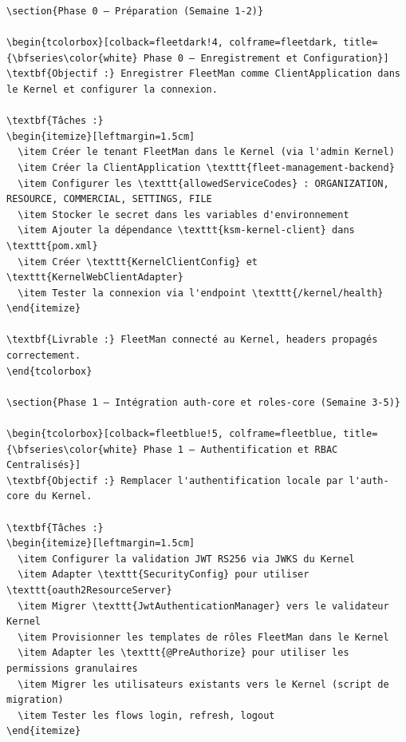 \documentclass[12pt,a4paper]{report}
\begin{document}
\begin{lstlisting}[style=javaStyle, caption={Handler d'erreurs Kernel dans GlobalExceptionHandler}]
\section{Phase 0 — Préparation (Semaine 1-2)}

\begin{tcolorbox}[colback=fleetdark!4, colframe=fleetdark, title={\bfseries\color{white} Phase 0 — Enregistrement et Configuration}]
\textbf{Objectif :} Enregistrer FleetMan comme ClientApplication dans le Kernel et configurer la connexion.

\textbf{Tâches :}
\begin{itemize}[leftmargin=1.5cm]
  \item Créer le tenant FleetMan dans le Kernel (via l'admin Kernel)
  \item Créer la ClientApplication \texttt{fleet-management-backend}
  \item Configurer les \texttt{allowedServiceCodes} : ORGANIZATION, RESOURCE, COMMERCIAL, SETTINGS, FILE
  \item Stocker le secret dans les variables d'environnement
  \item Ajouter la dépendance \texttt{ksm-kernel-client} dans \texttt{pom.xml}
  \item Créer \texttt{KernelClientConfig} et \texttt{KernelWebClientAdapter}
  \item Tester la connexion via l'endpoint \texttt{/kernel/health}
\end{itemize}

\textbf{Livrable :} FleetMan connecté au Kernel, headers propagés correctement.
\end{tcolorbox}

\section{Phase 1 — Intégration auth-core et roles-core (Semaine 3-5)}

\begin{tcolorbox}[colback=fleetblue!5, colframe=fleetblue, title={\bfseries\color{white} Phase 1 — Authentification et RBAC Centralisés}]
\textbf{Objectif :} Remplacer l'authentification locale par l'auth-core du Kernel.

\textbf{Tâches :}
\begin{itemize}[leftmargin=1.5cm]
  \item Configurer la validation JWT RS256 via JWKS du Kernel
  \item Adapter \texttt{SecurityConfig} pour utiliser \texttt{oauth2ResourceServer}
  \item Migrer \texttt{JwtAuthenticationManager} vers le validateur Kernel
  \item Provisionner les templates de rôles FleetMan dans le Kernel
  \item Adapter les \texttt{@PreAuthorize} pour utiliser les permissions granulaires
  \item Migrer les utilisateurs existants vers le Kernel (script de migration)
  \item Tester les flows login, refresh, logout
\end{itemize}


\end{lstlisting}
\end{document}
